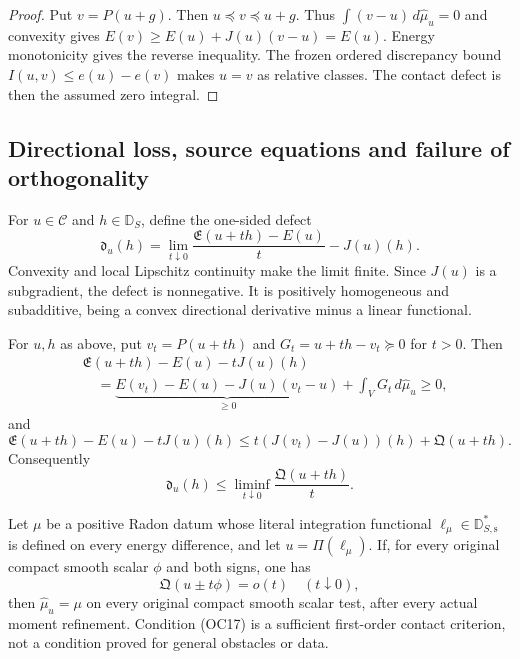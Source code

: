 \begin{proof}
Put $v=P(u+g)$.  Then $u\preceq v\preceq u+g$.
Thus $\int(v-u)\,d\widehat\mu_u=0$ and convexity gives
$E(v)\ge E(u)+J(u)(v-u)=E(u)$.  Energy monotonicity gives
the reverse inequality.  The frozen ordered discrepancy bound
$I(u,v)\le e(u)-e(v)$ makes $u=v$ as relative classes.
The contact defect is then the assumed zero integral.
\end{proof}

\subsection{Directional loss, source equations and failure of orthogonality}

For $u\in\mathscr C$ and $h\in\mathbb D_S$, define the
one-sided defect
\[
 \mathfrak d_u(h)=
 \lim_{t\downarrow0}
       \frac{\mathfrak E(u+th)-E(u)}{t}-J(u)(h).
 \tag{OC13}
\]
Convexity and local Lipschitz continuity make the limit finite.
Since $J(u)$ is a subgradient, the defect is nonnegative.
It is positively homogeneous and subadditive, being a convex
directional derivative minus a linear functional.

\begin{theorem}
\label{thm:r12-first-order-contact-gate}
For $u,h$ as above, put $v_t=P(u+th)$ and
$G_t=u+th-v_t\succeq0$ for $t>0$.  Then
\[
 \begin{split}
 &\mathfrak E(u+th)-E(u)-tJ(u)(h)\\
 &\quad=
 \underbrace{E(v_t)-E(u)-J(u)(v_t-u)}_{\ge0}
                       +\int_VG_t\,d\widehat\mu_u\ge0,
 \end{split}
 \tag{OC14}
\]
and
\[
 \mathfrak E(u+th)-E(u)-tJ(u)(h)
       \le t(J(v_t)-J(u))(h)+\mathfrak Q(u+th).
 \tag{OC15}
\]
Consequently
\[
 \mathfrak d_u(h)
       \le\liminf_{t\downarrow0}\frac{\mathfrak Q(u+th)}{t}.
 \tag{OC16}
\]

Let $\mu$ be a positive Radon datum whose literal integration
functional $\ell_\mu\in\mathbb D_{S,\mathrm s}^*$ is defined
on every energy difference, and let $u=\Pi(\ell_\mu)$.
If, for every original compact smooth scalar $\phi$ and both
signs, one has
\[
                  \mathfrak Q(u\pm t\phi)=o(t)
                                     \quad(t\downarrow0),
 \tag{OC17}
\]
then $\widehat\mu_u=\mu$ on every original compact smooth
scalar test, after every actual moment refinement.
Condition \textup{(OC17)} is a sufficient first-order contact
criterion, not a condition proved for general obstacles or data.
\end{theorem}

